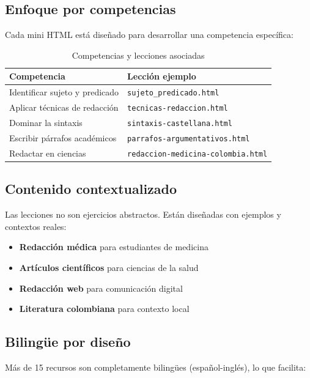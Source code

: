 \documentclass[12pt,spanish]{article}
\newcommand{\programa}[1]{\texttt{\color{color2}#1}}
\begin{document}
\subsection{Enfoque por competencias}

Cada mini HTML está diseñado para desarrollar una competencia específica:

\begin{table}[H]
\centering
\caption{Competencias y lecciones asociadas}
\label{tab:competencias}
\begin{tabular}{|p{5cm}|p{8cm}|}
\hline
\textbf{Competencia} & \textbf{Lección ejemplo} \\
\hline
Identificar sujeto y predicado & \programa{sujeto\_predicado.html} \\
\hline
Aplicar técnicas de redacción & \programa{tecnicas-redaccion.html} \\
\hline
Dominar la sintaxis & \programa{sintaxis-castellana.html} \\
\hline
Escribir párrafos académicos & \programa{parrafos-argumentativos.html} \\
\hline
Redactar en ciencias & \programa{redaccion-medicina-colombia.html} \\
\hline
\end{tabular}
\end{table}

\subsection{Contenido contextualizado}

Las lecciones no son ejercicios abstractos. Están diseñadas con ejemplos y contextos reales:

\begin{itemize}
    \item \textbf{Redacción médica} para estudiantes de medicina
    \item \textbf{Artículos científicos} para ciencias de la salud
    \item \textbf{Redacción web} para comunicación digital
    \item \textbf{Literatura colombiana} para contexto local
\end{itemize}

\subsection{Bilingüe por diseño}

Más de 15 recursos son completamente bilingües (español-inglés), lo que facilita:
\end{document}
